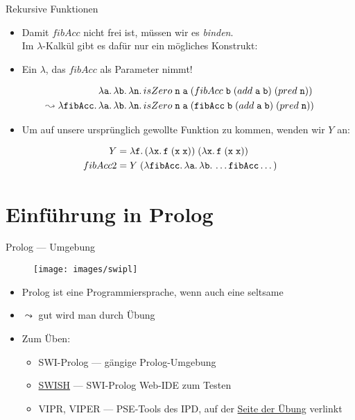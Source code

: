 \documentclass{beamer}
\begin{document}
\begin{frame}{Rekursive Funktionen}
	\begin{itemize}
		\item Damit $fibAcc$ nicht frei ist, müssen wir es \emph{binden}.\\
		      Im $\lambda$-Kalkül gibt es dafür nur ein mögliches Konstrukt:
		\item Ein $\lambda$, das $fibAcc$ als Parameter nimmt!
	\end{itemize}

	\begin{align*}
		& \lambda \texttt{a}.\, \lambda \texttt{b}.\, \lambda \texttt{n}.\, isZero\;\texttt{n}\;\texttt{a}\;(fibAcc\;\texttt{b}\;(add\;\texttt{a}\;\texttt{b})\;(pred\;\texttt{n})) \\
		\leadsto \lambda \texttt{fibAcc}.\, &\lambda \texttt{a}.\, \lambda \texttt{b}.\, \lambda \texttt{n}.\, isZero\;\texttt{n}\;\texttt{a}\;(\texttt{fibAcc}\;\texttt{b}\;(add\;\texttt{a}\;\texttt{b})\;(pred\;\texttt{n}))
	\end{align*}

	\begin{itemize}
		\item Um auf unsere ursprünglich gewollte Funktion zu kommen, wenden wir $Y$ an:
	\end{itemize}

	\begin{align*}
		Y &= \lambda \texttt{f}.\, (\lambda \texttt{x}.\, \texttt{f}\;(\texttt{x}\;\texttt{x}))\;(\lambda \texttt{x}.\, \texttt{f}\;(\texttt{x}\;\texttt{x})) \\
		fibAcc2 &= Y\;(\lambda \texttt{fibAcc}.\, \lambda \texttt{a}.\, \lambda \texttt{b}.\, \dots \texttt{fibAcc} \dots)
	\end{align*}
\end{frame}

\section{Einführung in Prolog}

\begin{frame}{Prolog --- Umgebung}
  \begin{figure}
    \texttt{[image: images/swipl]}
  \end{figure}
	\begin{itemize}
		\item Prolog ist eine Programmiersprache, wenn auch eine seltsame
		\item $\leadsto$ gut wird man durch Übung
		\item Zum Üben:
		\begin{itemize}
			\item SWI-Prolog --- gängige Prolog-Umgebung
			\item \href{https://swish.swi-prolog.org/}{SWISH} --- SWI-Prolog Web-IDE zum Testen
			\item VIPR, VIPER --- PSE-Tools des IPD, auf der \href{https://pp.ipd.kit.edu/lehre/WS202021/paradigmen/uebung/}{Seite der Übung} verlinkt
		\end{itemize}
	\end{itemize}
\end{frame}
\end{document}
